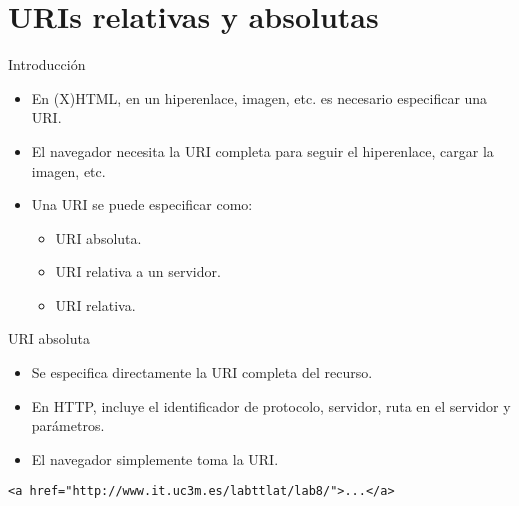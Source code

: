 
\part{URIs relativas y absolutas}


\begin{slide}{Introducción}
  \begin{itemize}
  \item En (X)HTML, en un hiperenlace, imagen, etc. es necesario
    especificar una URI.
  \item El navegador necesita la URI completa para seguir el 
    hiperenlace, cargar la imagen, etc.
  \item Una URI se puede especificar como:
    \begin{itemize}
    \item URI absoluta.
    \item URI relativa a un servidor.
    \item URI relativa.
    \end{itemize}
  \end{itemize}
\end{slide}

\begin{slide}{URI absoluta}
  \begin{itemize}
  \item Se especifica directamente la URI completa del recurso.
  \item En HTTP, incluye el identificador de protocolo, servidor,
    ruta en el servidor y parámetros.
  \item El navegador simplemente toma la URI.
\end{itemize}

\begin{Verbatim}[fontfamily=tt,fontsize=\fontsize{8}{8}]
<a href="http://www.it.uc3m.es/labttlat/lab8/">...</a>
\end{Verbatim}

\end{slide}

